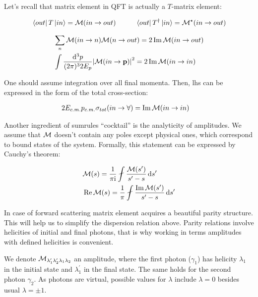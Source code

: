 Let's recall that matrix element in QFT is actually a $T$-matrix element:

\begin{align}
    & \bra{out} T \ket{in} = \mathcal{M}(in \rightarrow out) \qquad &\bra{out} T^\dag \ket{in} = \mathcal{M}^\star(in \rightarrow out)
\end{align}

\begin{align}
        & \sum_{n} \mathcal{M}(in \rightarrow n)  \mathcal{M}(n \rightarrow out) = 2 \Im \mathcal{M}(in \rightarrow out) \\
        & \int \frac{\dd[3]{p}}{(2 \pi)^3 2 E_{p}} \abs{\mathcal{M}(in \rightarrow \mathbf{p})}^2 = 2 \Im \mathcal{M}(in \rightarrow in)
\end{align}

One should assume integration over all final momenta. Then, lhs can be expressed in the form of the total cross-section:

\begin{align}
    & 2 E_{c.m.} p_{c.m.} \sigma_{tot}(in \rightarrow \forall) =  \Im \mathcal{M}(in \rightarrow in) \label{eq:optical-th}
\end{align}

Another ingredient of sumrules ``cocktail'' is the analyticity of amplitudes. We assume that $\mathcal{M}$ doesn't contain any poles except physical ones, which correspond to bound states of the system. Formally, this statement can be expressed by Cauchy's theorem:

\begin{align}
    & \Mcal(s) = \frac{1}{\pi \ii} \fint \frac{\Mcal(s^\prime)}{s^\prime - s} \dd{s^\prime} \\
    & \Re \Mcal(s) = \frac{1}{\pi} \fint \frac{\Im \Mcal(s^\prime)}{s^\prime - s} \dd{s^\prime} \label{eq:disp-rel-gen}
\end{align}

In case of forward scattering matrix element acquires a beautiful parity structure. This will help us to simplify the dispersion relation above. Parity relations involve helicities of initial and final photons, that is why working in terms amplitudes with defined helicities is convenient.

We denote $\mathcal{M}_{\lambda^\prime_1 \lambda^\prime_2 \lambda_1 \lambda_2}$ an amplitude, where the first photon ($\gamma_1$) has helicity $\lambda_1$ in the initial state and $\lambda_1^\prime$ in the final state. The same holds for the second photon $\gamma_2$. As photons are virtual, possible values for $\lambda$ include $\lambda=0$ besides usual $\lambda=\pm1$.

